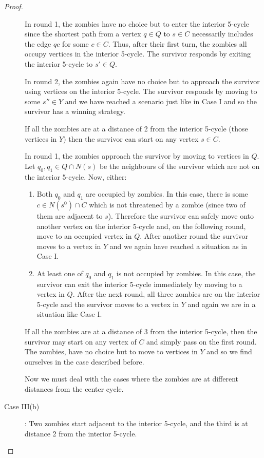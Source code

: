 \begin{proof}
\begin{description}
In round 1, the zombies have no choice but to enter the interior 5-cycle since the shortest path from a vertex $q \in Q$ to
$s \in C$ necessarily includes the edge $qc$ for some $c \in C$. Thus, after their first turn, the zombies all occupy vertices in the interior 5-cycle.
The survivor responds by exiting the interior 5-cycle to $s' \in Q$.

In round 2, the zombies again have no choice but to approach the survivor using vertices on the interior 5-cycle. The survivor responds by moving to
some $s'' \in Y$ and we have reached a scenario just like in Case I and so the survivor has a winning strategy.

If all the zombies are at a distance of 2 from the interior 5-cycle (those vertices in $Y$) then the survivor can start on any vertex $s \in C$.

In round 1, the zombies approach the survivor by moving to vertices in $Q$. Let $q_0, q_1 \in Q \cap N(s)$ be the neighbours of the survivor
which are not on the interior 5-cycle. Now, either:

\begin{enumerate}
\item Both $q_0$ and $q_1$ are occupied by zombies. In this case, there is some $c \in N(s^0) \cap C$ which is not threatened by a zombie (since two of them are adjacent
to $s$). Therefore the survivor can safely move onto another vertex on the interior 5-cycle and, on the following round, move to an occupied vertex in $Q$. After
another round the survivor moves to a vertex in $Y$ and we again have reached a situation as in Case I.

\item At least one of $q_0$ and $q_1$ is not occupied by zombies. In this case, the survivor can exit the interior 5-cycle immediately by moving to a vertex in $Q$. After
 the next round, all three zombies are on the interior 5-cycle and the survivor moves to a vertex in $Y$ and again we are in a situation like Case I.
\end{enumerate}

If all the zombies are at a distance of 3 from the interior 5-cycle, then the survivor may start on any vertex of $C$ and simply pass on the first round. The zombies,
have no choice but to move to vertices in $Y$ and so we find ourselves in the case described before.

Now we must deal with the cases where the zombies are at different distances from the center cycle.

\item[Case III(b)]: Two zombies start adjacent to the interior 5-cycle, and the third is at distance 2 from the interior 5-cycle.


\end{description}
\end{proof}
